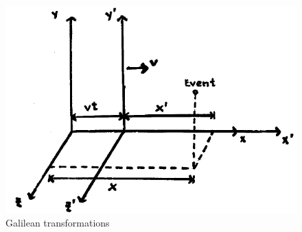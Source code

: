 \documentclass[11pt, a4paper,oneside,openright]{book}
\numberwithin{equation}{section}
\begin{document}
\begin{figure}[ht]
\begin{center}
\includegraphics[scale=0.5]{Draw/lec2_4.png}
\end{center}
\caption{Galilean transformations}
\label{fig:lec2_4}
\end{figure}
\end{document}

